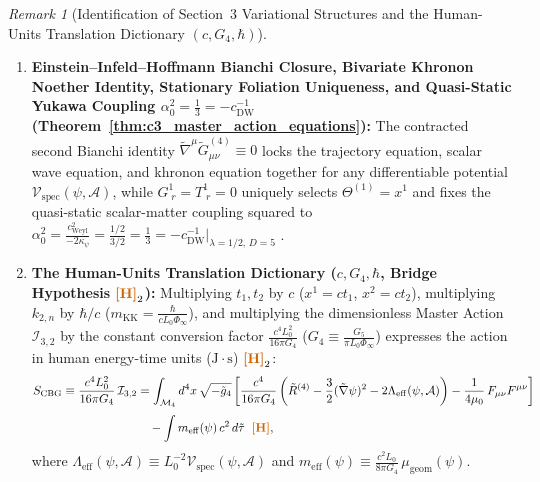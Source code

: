 \documentclass[11pt,a4paper]{article}
\newcommand{\catD}{\text{\textbf{\textcolor{blue!75!black}{[D]}}}}
\newcommand{\catH}{\text{\textbf{\textcolor{orange!80!black}{[H]}}}}
\theoremstyle{definition}
\theoremstyle{plain}
\theoremstyle{remark}
\newtheorem{remark}[axiom]{Remark}
\begin{document}
\begin{remark}[{Identification of Section~3 Variational Structures and the Human-Units Translation Dictionary $(c, G_4, \hbar)$}]
\begin{enumerate}
  \item \textbf{Einstein--Infeld--Hoffmann Bianchi Closure, Bivariate Khronon Noether Identity, Stationary Foliation Uniqueness, and Quasi-Static Yukawa Coupling $\alpha_0^2 = \frac{1}{3} = -c_{\mathrm{DW}}^{-1}$ (Theorem~\ref{thm:c3_master_action_equations}):} The contracted second Bianchi identity $\tilde{\nabla}^\mu\tilde{G}_{\mu\nu}^{(4)} \equiv 0$ locks the trajectory equation, scalar wave equation, and khronon equation together for any differentiable potential $\mathcal{V}_{\mathrm{spec}}(\psi, \mathcal{A})$, while $G^1_{\;r} = T^1_{\;r} = 0$ uniquely selects $\Theta^{(1)} = x^1$ and fixes the quasi-static scalar-matter coupling squared to $\alpha_0^2 = \frac{c_{\mathrm{Weyl}}^2}{-2\kappa_\psi} = \frac{1/2}{3/2} = \frac{1}{3} = -c_{\mathrm{DW}}^{-1}\big|_{\lambda=1/2,\,D=5}$ \catD.
  \item \textbf{The Human-Units Translation Dictionary ($c, G_4, \hbar$, Bridge Hypothesis $\catH_2$):} Multiplying $t_1, t_2$ by $c$ ($x^1 = c t_1$, $x^2 = c t_2$), multiplying $k_{2,n}$ by $\hbar/c$ ($m_{\mathrm{KK}} = \frac{\hbar}{c L_0\Phi_\infty}$), and multiplying the dimensionless Master Action $\mathcal{I}_{3,2}$ by the constant conversion factor $\frac{c^4 L_0^2}{16\pi G_4}$ ($G_4 \equiv \frac{G_5}{\pi L_0\Phi_\infty}$) expresses the action in human energy-time units ($\mathrm{J\cdot s}$) $\catH_2$:
  \begin{align}
  S_{\mathrm{CBG}} \equiv \frac{c^4 L_0^2}{16\pi G_4}\,\mathcal{I}_{3,2} &= \int_{\mathcal{M}_4} d^4x\,\sqrt{-\tilde{g}_4}\left[\frac{c^4}{16\pi G_4}\left(\tilde{R}^{(4)} - \frac{3}{2}(\tilde{\nabla}\psi)^2 - 2\Lambda_{\mathrm{eff}}(\psi, \mathcal{A})\right) - \frac{1}{4\mu_0}\,F_{\mu\nu}F^{\mu\nu}\right] \nonumber \\[3pt]
  &\quad - \int m_{\mathrm{eff}}(\psi)\,c^2\,d\tilde{\tau} \;\;\catH, \label{eq:c3_human_units_action}
  \end{align}
  where $\Lambda_{\mathrm{eff}}(\psi, \mathcal{A}) \equiv L_0^{-2}\mathcal{V}_{\mathrm{spec}}(\psi, \mathcal{A})$ and $m_{\mathrm{eff}}(\psi) \equiv \frac{c^2 L_0}{8\pi G_4}\,\mu_{\mathrm{geom}}(\psi)$.
\end{enumerate}
\end{remark}
\end{document}
